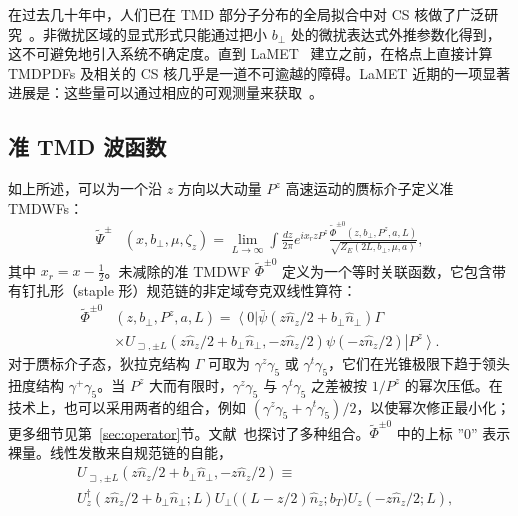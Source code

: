 在过去几十年中，人们已在 TMD 部分子分布的全局拟合中对 CS 核做了广泛研究~\cite{Landry:1999an,Landry:2002ix,DAlesio:2014mrz,Sun:2014dqm,Konychev:2005iy,Bacchetta:2017gcc,Scimemi:2017etj,Scimemi:2019cmh,Bacchetta:2019sam}。非微扰区域的显式形式只能通过把小 $b_{\perp}$ 处的微扰表达式外推参数化得到，这不可避免地引入系统不确定度。直到 LaMET~\cite{Ji:2013dva,Ji:2014gla} 建立之前，在格点上直接计算 TMDPDFs 及相关的 CS 核几乎是一道不可逾越的障碍。LaMET 近期的一项显著进展是：这些量可以通过相应的可观测量来获取~\cite{Ebert:2019okf,Ji:2019sxk,Ji:2019ewn,Ji:2021znw}。



\subsection{准 TMD 波函数}
如上所述，可以为一个沿 $z$ 方向以大动量 $P^z$ 高速运动的赝标介子定义准 TMDWFs：
\begin{align}
	\tilde{\Psi}^{\pm}&\left(x,b_{\perp},\mu,\zeta_z\right)=\lim_{L\to\infty}\int\frac{dz}{2\pi}e^{ix_rzP^z}\frac{\tilde{\Phi}^{\pm0}\left(z,b_{\perp},P^z,a,L\right)}{\sqrt{Z_E(2L,b_{\perp},\mu, a)}},\label{eq:quasiWFinmomentumspace}
\end{align}
其中 $x_r=x-\frac{1}{2}$。未减除的准 TMDWF $\tilde{\Phi}^{\pm0}$ 定义为一个等时关联函数，它包含带有钉扎形（staple 形）规范链的非定域夸克双线性算符：
\begin{align}
	\tilde{\Phi}^{\pm0}&\left(z,b_{\perp},P^z,a,L\right) =\left\langle 0\right|\bar{\psi}\left(z \hat{n}_{z}/2+b_{\perp} \hat{n}_{\perp}\right) \Gamma \nonumber\\
	&\times U_{\sqsupset, \pm L}\left(z \hat{n}_{z}/2+b_{\perp} \hat{n}_{\perp},-z \hat{n}_{z}/2\right) \psi\left(-z \hat{n}_{z}/2\right)\left| P^{z}\right\rangle. \label{eq:quasiWFincoordinatespace}
\end{align}
对于赝标介子态，狄拉克结构 $\Gamma$ 可取为 $\gamma^z\gamma_5$ 或 $\gamma^t\gamma_5$，它们在光锥极限下趋于领头扭度结构 $\gamma^+\gamma_5$。当 $P^z$ 大而有限时，$\gamma^z\gamma_5$ 与 $\gamma^t\gamma_5$ 之差被按 $1/P^z$ 的幂次压低。在技术上，也可以采用两者的组合，例如 $\left(\gamma^z\gamma_5+\gamma^t\gamma_5\right)/2$，以使幂次修正最小化；更多细节见第~\ref{sec:operator}节。文献~\cite{Li:2021wvl}也探讨了多种组合。$\tilde{\Phi}^{\pm0}$ 中的上标 ''0'' 表示裸量。线性发散来自规范链的自能，
\begin{align}
	&U_{\sqsupset, \pm L}\left(z \hat{n}_{z}/2+b_{\perp} \hat{n}_{\perp},-z \hat{n}_{z}/2\right) \equiv\nonumber\\
	&	U_z^{\dagger}\left(z \hat{n}_{z}/2+b_{\perp} \hat{n}_{\perp}; L \right) U_{\perp}\big((L-z /2)\hat{n}_{z};{b}_T \big) U_z\left( -z \hat{n}_{z}/2; L \right), \label{eq:stapleshapedUlink}
\end{align}

